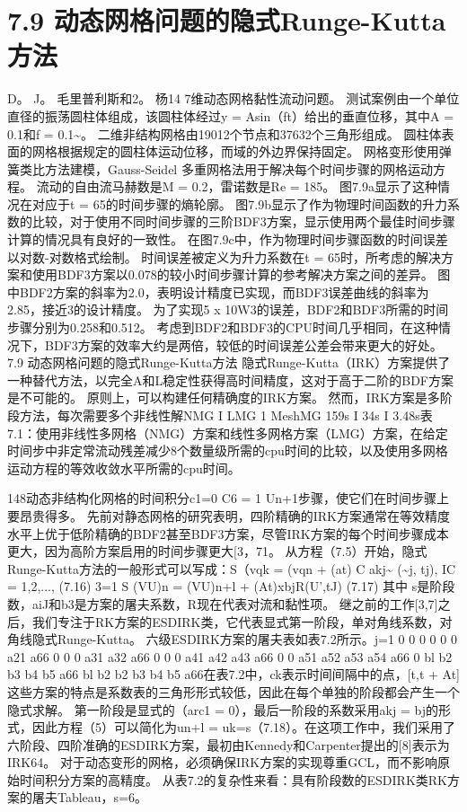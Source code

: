 \documentclass[UTF8,11pt,a4paper,openany,fontset=fandol]{ctexbook}
\begin{document}
\section{7.9 动态网格问题的隐式Runge-Kutta方法}
D。 J。 毛里普利斯和2。 杨14 7维动态网格黏性流动问题。 测试案例由一个单位直径的振荡圆柱体组成，该圆柱体经过y = Asin（ft）给出的垂直位移，其中A = 0.1和f = 0.1\textasciitilde{}。 二维非结构网格由19012个节点和37632个三角形组成。 圆柱体表面的网格根据规定的圆柱体运动位移，而域的外边界保持固定。 网格变形使用弹簧类比方法建模，Gauss-Seidel 多重网格法用于解决每个时间步骤的网格运动方程。 流动的自由流马赫数是M = 0.2，雷诺数是Re = 185。 图7.9a显示了这种情况在对应于t = 65的时间步骤的熵轮廓。 图7.9b显示了作为物理时间函数的升力系数的比较，对于使用不同时间步骤的三阶BDF3方案，显示使用两个最佳时间步骤计算的情况具有良好的一致性。 在图7.9c中，作为物理时间步骤函数的时间误差以对数-对数格式绘制。 时间误差被定义为升力系数在t = 65时，所考虑的解决方案和使用BDF3方案以0.078的较小时间步骤计算的参考解决方案之间的差异。 图中BDF2方案的斜率为2.0，表明设计精度已实现，而BDF3误差曲线的斜率为2.85，接近3的设计精度。 为了实现5 x 10W3的误差，BDF2和BDF3所需的时间步骤分别为0.258和0.512。 考虑到BDF2和BDF3的CPU时间几乎相同，在这种情况下，BDF3方案的效率大约是两倍，较低的时间误差公差会带来更大的好处。 7.9 动态网格问题的隐式Runge-Kutta方法 隐式Runge-Kutta（IRK）方案提供了一种替代方法，以完全A和L稳定性获得高时间精度，这对于高于二阶的BDF方案是不可能的。 原则上，可以构建任何精确度的IRK方案。 然而，IRK方案是多阶段方法，每次需要多个非线性解NMG I LMG 1 MeshMG 159s I 34s I 3.48s表7.1：使用非线性多网格（NMG）方案和线性多网格方案（LMG）方案，在给定时间步中非定常流动残差减少8个数量级所需的cpu时间的比较，以及使用多网格运动方程的等效收敛水平所需的cpu时间。

148动态非结构化网格的时间积分c1=0 C6 = 1 Un+1步骤，使它们在时间步骤上要昂贵得多。 先前对静态网格的研究表明，四阶精确的IRK方案通常在等效精度水平上优于低阶精确的BDF2甚至BDF3方案，尽管IRK方案的每个时间步骤成本更大，因为高阶方案启用的时间步骤更大[3，71。 从方程（7.5）开始，隐式Runge-Kutta方法的一般形式可以写成：S（vqk = (vqn + (at) C akj\textasciitilde{} (\textasciitilde{}j, tj), IC = 1,2,..., (7.16) 3=1 S (VU)n = (VU)n+l + (At)xbjR(U',tJ) (7.17) 其中 s是阶段数，aiJ和b3是方案的屠夫系数，R现在代表对流和黏性项。 继之前的工作[3,7]之后，我们专注于RK方案的ESDIRK类，它代表显式第一阶段，单对角线系数，对角线隐式Runge-Kutta。 六级ESDIRK方案的屠夫表如表7.2所示。j=1 0 0 0 0 0 0 a21 a66 0 0 0 a31 a32 a66 0 0 0 a41 a42 a43 a66 0 0 a51 a52 a53 a54 a66 0 bl b2 b3 b4 b5 a66 bl b2 b2 b3 b4 b5 a66在表7.2中，ck表示时间间隔中的点，[t,t + At] 这些方案的特点是系数表的三角形形式较低，因此在每个单独的阶段都会产生一个隐式求解。 第一阶段是显式的（arc1 = 0），最后一阶段的系数采用akj = bj的形式，因此方程（5）可以简化为un+l = uk=s（7.18）。在这项工作中，我们采用了六阶段、四阶准确的ESDIRK方案，最初由Kennedy和Carpenter提出的[8]表示为IRK64。 对于动态变形的网格，必须确保IRK方案的实现尊重GCL，而不影响原始时间积分方案的高精度。 从表7.2的复杂性来看：具有阶段数的ESDIRK类RK方案的屠夫Tableau，s=6。
\end{document}
